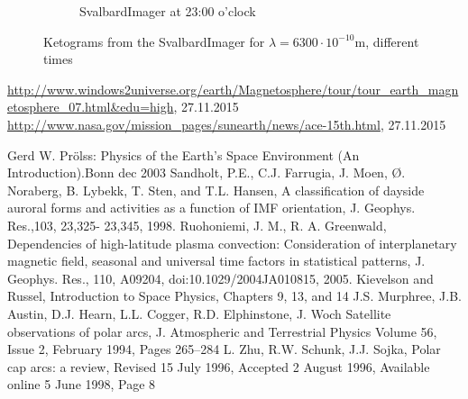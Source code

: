 \documentclass[10pt,a4paper]{article}
\begin{document}
\begin{figure}[h]
\begin{subfigure}{0.3\textwidth}
	\caption{ SvalbardImager at 23:00 o'clock \label{SBI_6_23}}
\end{subfigure}
\caption{Ketograms from the SvalbardImager for $\lambda=6300 \cdot 10^{-10} \mathrm{m}$, different times }
\label{SBI_6_timedevelop}
\end{figure}
\newpage


\begin{thebibliography}{mustermarke}
 \url{http://www.windows2universe.org/earth/Magnetosphere/tour/tour_earth_magnetosphere_07.html&edu=high}, 27.11.2015
 \url{http://www.nasa.gov/mission_pages/sunearth/news/ace-15th.html}, 27.11.2015

 Gerd W. Prölss: Physics of the Earth's Space Environment (An Introduction).Bonn  dec 2003 
 Sandholt, P.E., C.J. Farrugia, J. Moen, Ø. Noraberg, B. Lybekk, T. Sten, and T.L. Hansen, A classification
of dayside auroral forms and activities as a function of IMF orientation, J. Geophys. Res.,103, 23,325-
23,345, 1998.
 Ruohoniemi, J. M., R. A. Greenwald, Dependencies of high-latitude plasma convection: Consideration
of interplanetary magnetic field, seasonal and universal time factors in statistical patterns, J. Geophys.
Res., 110, A09204, doi:10.1029/2004JA010815, 2005.
 Kievelson and Russel, Introduction to Space Physics, Chapters 9, 13, and 14
 J.S. Murphree, J.B. Austin, D.J. Hearn, L.L. Cogger, R.D. Elphinstone, J. Woch Satellite observations of polar arcs, J. Atmospheric and Terrestrial Physics
Volume 56, Issue 2, February 1994, Pages 265–284
     L. Zhu, R.W. Schunk, J.J. Sojka, Polar cap arcs: a review, Revised 15 July 1996, Accepted 2 August 1996, Available online 5 June 1998, Page 8

\end{thebibliography}
\end{document}
